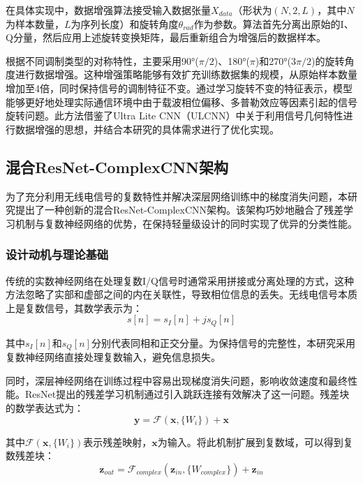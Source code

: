 \documentclass[conference]{IEEEtran}
\begin{document}
在具体实现中，数据增强算法接受输入数据张量$X_{data}$（形状为$(N, 2, L)$，其中$N$为样本数量，$L$为序列长度）和旋转角度$\theta_{rad}$作为参数。算法首先分离出原始的I、Q分量，然后应用上述旋转变换矩阵，最后重新组合为增强后的数据样本。

根据不同调制类型的对称特性，主要采用90°($\pi/2$)、180°($\pi$)和270°($3\pi/2$)的旋转角度进行数据增强。这种增强策略能够有效扩充训练数据集的规模，从原始样本数量增加至4倍，同时保持信号的调制特征不变。通过学习旋转不变的特征表示，模型能够更好地处理实际通信环境中由于载波相位偏移、多普勒效应等因素引起的信号旋转问题。此方法借鉴了Ultra Lite CNN（ULCNN）\cite{b1}中关于利用信号几何特性进行数据增强的思想，并结合本研究的具体需求进行了优化实现。


\subsection{混合ResNet-ComplexCNN架构}

为了充分利用无线电信号的复数特性并解决深层网络训练中的梯度消失问题，本研究提出了一种创新的混合ResNet-ComplexCNN架构。该架构巧妙地融合了残差学习机制与复数神经网络的优势，在保持轻量级设计的同时实现了优异的分类性能。

\subsubsection{设计动机与理论基础}

传统的实数神经网络在处理复数I/Q信号时通常采用拼接或分离处理的方式，这种方法忽略了实部和虚部之间的内在关联性，导致相位信息的丢失。无线电信号本质上是复数信号，其数学表示为：
\begin{equation}
s[n] = s_I[n] + js_Q[n]
\end{equation}

其中$s_I[n]$和$s_Q[n]$分别代表同相和正交分量。为保持信号的完整性，本研究采用复数神经网络直接处理复数输入，避免信息损失。

同时，深层神经网络在训练过程中容易出现梯度消失问题，影响收敛速度和最终性能。ResNet提出的残差学习机制通过引入跳跃连接有效解决了这一问题。残差块的数学表达式为：
\begin{equation}
\mathbf{y} = \mathcal{F}(\mathbf{x}, \{W_i\}) + \mathbf{x}
\end{equation}

其中$\mathcal{F}(\mathbf{x}, \{W_i\})$表示残差映射，$\mathbf{x}$为输入。将此机制扩展到复数域，可以得到复数残差块：
\begin{equation}
\mathbf{z}_{out} = \mathcal{F}_{complex}(\mathbf{z}_{in}, \{W_{complex}\}) + \mathbf{z}_{in}
\end{equation}
\end{document}
